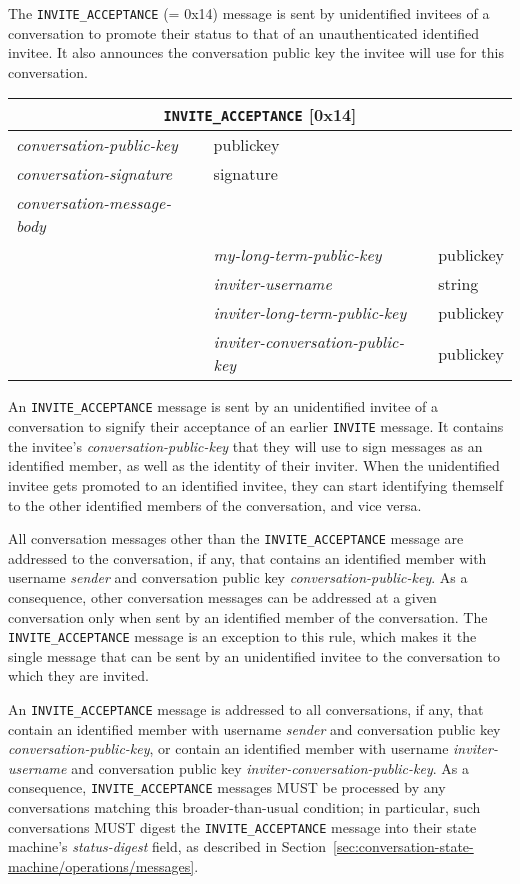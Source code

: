 \documentclass{article}
\def\message#1{\texttt{#1}}
\def\field#1{\textit{#1}}
\def\smfield#1{\textsl{#1}}
\def\type#1{\textsf{#1}}
\newenvironment{conversationmessage}[2]{
\newcommand{\messagefield}[2]{
& \field{##1} & \type{##2} \\
\hline
}
\hspace{2em minus 2em}\begin{tabular}{|l|l|l|}
\hline
\multicolumn{3}{|c|}{\message{#1} [#2]} \\
\hline
\hline
\field{conversation-public-key} & \multicolumn{2}{l|}{\type{publickey}} \\
\hline
\field{conversation-signature} & \multicolumn{2}{l|}{\type{signature}} \\
\hline
\field{conversation-message-body} & \multicolumn{2}{l|}{} \\
\hline
}{
\end{tabular}
}
\begin{document}
The \message{INVITE\_ACCEPTANCE} (= 0x14) message is sent by unidentified invitees of a conversation to promote their status to that of an unauthenticated identified invitee.
It also announces the conversation public key the invitee will use for this conversation.

\begin{conversationmessage}{INVITE\_ACCEPTANCE}{0x14}
\messagefield{my-long-term-public-key}{publickey}
\messagefield{inviter-username}{string}
\messagefield{inviter-long-term-public-key}{publickey}
\messagefield{inviter-conversation-public-key}{publickey}
\end{conversationmessage}

An \message{INVITE\_ACCEPTANCE} message is sent by an unidentified invitee of a conversation to signify their acceptance of an earlier \message{INVITE} message.
It contains the invitee's \field{conversation-public-key} that they will use to sign messages as an identified member, as well as the identity of their inviter.
When the unidentified invitee gets promoted to an identified invitee, they can start identifying themself to the other identified members of the conversation, and vice versa.

All conversation messages other than the \message{INVITE\_ACCEPTANCE} message are addressed to the conversation, if any, that contains an identified member with username \field{sender} and conversation public key \field{conversation-public-key}.
As a consequence, other conversation messages can be addressed at a given conversation only when sent by an identified member of the conversation.
The \message{INVITE\_ACCEPTANCE} message is an exception to this rule, which makes it the single message that can be sent by an unidentified invitee to the conversation to which they are invited.

An \message{INVITE\_ACCEPTANCE} message is addressed to all conversations, if any, that contain an identified member with username \field{sender} and conversation public key \field{conversation-public-key}, or contain an identified member with username \field{inviter-username} and conversation public key \field{inviter-conversation-public-key}.
As a consequence, \message{INVITE\_ACCEPTANCE} messages MUST be processed by any conversations matching this broader-than-usual condition; in particular, such conversations MUST digest the \message{INVITE\_ACCEPTANCE} message into their state machine's \smfield{status-digest} field, as described in Section~\ref{sec:conversation-state-machine/operations/messages}.
\end{document}
